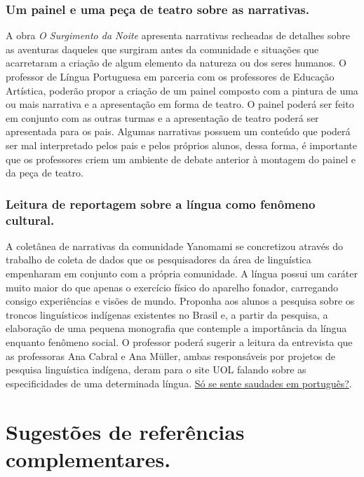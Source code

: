 \documentclass[12pt]{extarticle}
\begin{document}
{\subsubsection{Um painel e uma peça de teatro sobre as narrativas.}



  A obra \emph{O Surgimento da Noite} apresenta narrativas recheadas de
  detalhes sobre as aventuras daqueles que surgiram antes da comunidade
  e situações que acarretaram a criação de algum elemento da natureza ou
  dos seres humanos. O professor de Língua Portuguesa em parceria com os
  professores de Educação Artística, poderão propor a criação de um
  painel composto com a pintura de uma ou mais narrativa e a
  apresentação em forma de teatro. O painel poderá ser feito em conjunto
  com as outras turmas e a apresentação de teatro poderá ser apresentada
  para os pais. Algumas narrativas possuem um conteúdo que poderá ser
  mal interpretado pelos pais e pelos próprios alunos, dessa forma, é
  importante que os professores criem um ambiente de debate anterior à
  montagem do painel e da peça de teatro.

\subsubsection{Leitura de reportagem sobre a língua como fenômeno cultural.}


  A coletânea de narrativas da comunidade Yanomami se concretizou
  através do trabalho de coleta de dados que os pesquisadores da área de
  linguística empenharam em conjunto com a própria comunidade. A língua
  possui um caráter muito maior do que apenas o exercício físico do
  aparelho fonador, carregando consigo experiências e visões de mundo.
  Proponha aos alunos a pesquisa sobre os troncos linguísticos indígenas
  existentes no Brasil e, a partir da pesquisa, a elaboração de uma pequena
  monografia que contemple a importância da língua enquanto fenômeno
  social. O professor poderá sugerir a leitura da entrevista que as
  professoras Ana Cabral e Ana Müller, ambas responsáveis por projetos de
  pesquisa linguística indígena, deram para o site UOL falando sobre as
  especificidades de uma determinada língua.
  \href{https://tab.uol.com.br/noticias/redacao/2020/10/11/saudade-ansiedade-aconchego-como-a-lingua-influencia-cultura-e-sensacoes.html}
  {Só se sente saudades em português?}.


\section{Sugestões de referências complementares.}\label{sugestoes}

}
\end{document}
